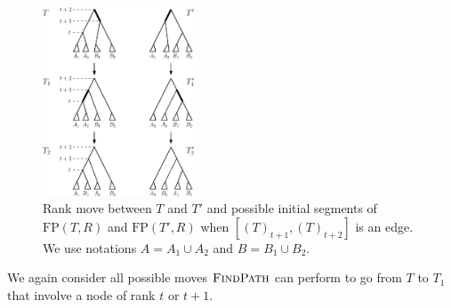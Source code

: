 \documentclass[11pt]{amsart}
\newcommand{\findpath}{\textsc{FindPath}}
\newcommand{\fp}{\mathrm{FP}}
\begin{document}
\begin{figure}[ht]
\centering
\includegraphics[width=0.4\textwidth]{thm_fp_rank1}
\caption{Rank move between $T$ and $T'$ and possible initial segments of $\fp(T, R)$ and $\fp(T', R)$ when $[(T)_{t+1}, (T)_{t+2}]$ is an edge.
We use notations ${A = A_1 \cup A_2}$ and $B = B_1 \cup B_2$.}
\label{fig:thm_fp_rank1}
\end{figure}

We again consider all possible moves $\findpath$ can perform to go from $T$ to $T_1$ that involve a node of rank $t$ or $t+1$.
\end{document}
